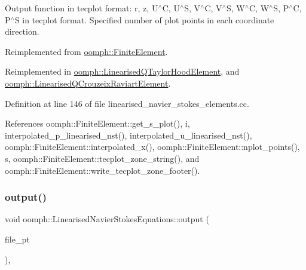Output function in tecplot format\+: r, z, U$^\wedge$C, U$^\wedge$S, V$^\wedge$C, V$^\wedge$S, W$^\wedge$C, W$^\wedge$S, P$^\wedge$C, P$^\wedge$S in tecplot format. Specified number of plot points in each coordinate direction. 

Reimplemented from \hyperlink{classoomph_1_1FiniteElement_afa9d9b2670f999b43e6679c9dd28c457}{oomph\+::\+Finite\+Element}.



Reimplemented in \hyperlink{classoomph_1_1LinearisedQTaylorHoodElement_a323f84cf9d6e3fc85e96e6e0a0f23ada}{oomph\+::\+Linearised\+Q\+Taylor\+Hood\+Element}, and \hyperlink{classoomph_1_1LinearisedQCrouzeixRaviartElement_adc35ea04b68f963b4a17f206c89bae25}{oomph\+::\+Linearised\+Q\+Crouzeix\+Raviart\+Element}.



Definition at line 146 of file linearised\+\_\+navier\+\_\+stokes\+\_\+elements.\+cc.



References oomph\+::\+Finite\+Element\+::get\+\_\+s\+\_\+plot(), i, interpolated\+\_\+p\+\_\+linearised\+\_\+nst(), interpolated\+\_\+u\+\_\+linearised\+\_\+nst(), oomph\+::\+Finite\+Element\+::interpolated\+\_\+x(), oomph\+::\+Finite\+Element\+::nplot\+\_\+points(), s, oomph\+::\+Finite\+Element\+::tecplot\+\_\+zone\+\_\+string(), and oomph\+::\+Finite\+Element\+::write\+\_\+tecplot\+\_\+zone\+\_\+footer().

\mbox{\label{classoomph_1_1LinearisedNavierStokesEquations_a2e1eef71bdd6a06e2b7e8b8488e39437}} 
\subsubsection{\texorpdfstring{output()}{output()}\hspace{0.1cm}{\footnotesize\ttfamily [3/4]}}
{\footnotesize\ttfamily void oomph\+::\+Linearised\+Navier\+Stokes\+Equations\+::output (\begin{DoxyParamCaption}\item[{F\+I\+LE $\ast$}]{file\+\_\+pt }\end{DoxyParamCaption})\hspace{0.3cm}{\ttfamily [inline]}, {\ttfamily [virtual]}}



